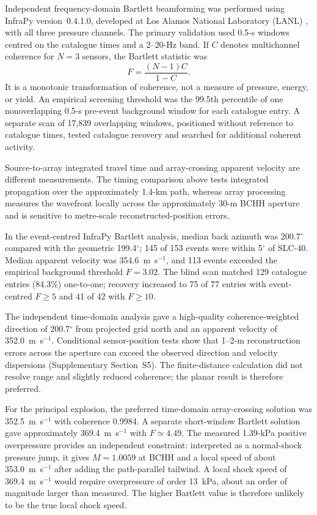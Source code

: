 \documentclass[]{seismica}
\begin{document}
Independent frequency-domain Bartlett beamforming was performed using InfraPy
version~0.4.1.0, developed at Los Alamos National Laboratory (LANL)
\citep{webster_infrapy_2025}, with all three pressure channels. The primary
validation used 0.5-s windows centred on the catalogue times and a 2--20-Hz
band. If $C$ denotes multichannel coherence for $N=3$ sensors, the Bartlett
statistic was
\begin{equation}
 F=\frac{(N-1)C}{1-C}.
\end{equation}
It is a monotonic transformation of coherence, not a measure of pressure,
energy, or yield. An empirical screening threshold was the 99.5th percentile
of one nonoverlapping 0.5-s pre-event background window for each catalogue
entry. A separate scan of 17,839 overlapping windows, positioned without
reference to catalogue times, tested catalogue recovery and searched for
additional coherent activity.

Source-to-array integrated travel time and array-crossing apparent velocity are
different measurements. The timing comparison above tests integrated
propagation over the approximately 1.4-km path, whereas array processing
measures the wavefront locally across the approximately 30-m BCHH aperture and
is sensitive to metre-scale reconstructed-position errors.

In the event-centred InfraPy Bartlett analysis, median back azimuth was
200.7$^\circ$ compared with the geometric 199.4$^\circ$; 145 of 153 events
were within 5$^\circ$ of SLC-40. Median apparent velocity was
354.6~m~s$^{-1}$, and 113 events exceeded the empirical background threshold
$F=3.02$. The blind scan matched 129 catalogue entries (84.3\%) one-to-one;
recovery increased to 75 of 77 entries with event-centred $F\geq5$ and 41 of
42 with $F\geq10$.

The independent time-domain analysis gave a high-quality coherence-weighted
direction of 200.7$^\circ$ from projected grid north and an apparent velocity
of 352.0~m~s$^{-1}$. Conditional sensor-position tests show that 1--2-m
reconstruction errors across the aperture can exceed the observed direction
and velocity dispersions (Supplementary Section~S5). The finite-distance
calculation did not resolve range and slightly reduced coherence; the planar
result is therefore preferred.

For the principal explosion, the preferred time-domain array-crossing solution
was 352.5~m~s$^{-1}$ with coherence 0.9984. A separate short-window Bartlett
solution gave approximately 369.4~m~s$^{-1}$ with $F\simeq4.49$. The measured
1.39-kPa positive overpressure provides an independent constraint: interpreted
as a normal-shock pressure jump, it gives $M=1.0059$ at BCHH and a local speed
of about 353.0~m~s$^{-1}$ after adding the path-parallel tailwind. A local
shock speed of 369.4~m~s$^{-1}$ would require overpressure of order 13~kPa,
about an order of magnitude larger than measured. The higher Bartlett value is
therefore unlikely to be the true local shock speed.
\end{document}
